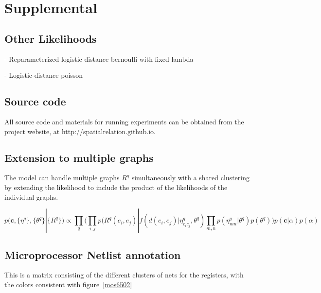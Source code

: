 \documentclass{article}
\renewcommand{\vec}[1]{\mathbf{#1}}
\begin{document}
\newpage
\section{Supplemental}

\subsection{Other Likelihoods}
\label{supp:otherlikelihoods}
 - Reparameterized logistic-distance bernoulli with fixed lambda

 - Logistic-distance poisson

\subsection{Source code}

All source code and materials for running experiments can be
obtained from the project website, at http://spatialrelation.github.io. 

\subsection{Extension to multiple graphs}
\label{supp:multigraph}
The model can handle multiple graphs $R^q$ simultaneously with a shared clustering by extending the likelihood to include the product of the likelihoods of the individual graphs. 

\begin{equation}
  p(\vec{c}, \{\eta^q\}, \{\theta^q\} | \{R^q\} ) \propto \prod_q \Bigg(\prod_{i, j} p(R^q(e_i, e_j) | f(d(e_i, e_j) | \eta^q_{c_ic_j}, \theta^q) \prod_{m, n} p(\eta^q_{mn} | \theta^q)  p(\theta^q) \Bigg) p(\vec{c} | \alpha) p(\alpha) 
\end{equation}

\FloatBarrier

\subsection{Microprocessor Netlist annotation}
\label{supp:mos6502netlist}
This is a matrix consisting of the different clusters of nets for 
the registers, with the colors consistent with figure~\ref{mos6502}
\end{document}
